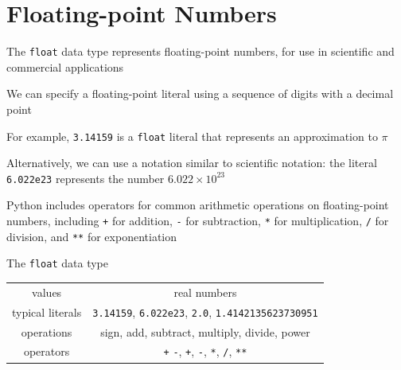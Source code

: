 \documentclass[8pt,a4paper,compress]{beamer}
\begin{document}
\section{Floating-point Numbers}
\begin{frame}[fragile]
\pause

The \lstinline{float} data type represents floating-point numbers, for use in scientific and commercial applications

\pause\bigskip

We can specify a floating-point literal using a sequence of digits with a decimal point

\pause\bigskip

For example, \lstinline{3.14159} is a \lstinline{float} literal that represents an approximation to $\pi$

\pause\bigskip

Alternatively, we can use a notation similar to scientific notation: the literal \lstinline{6.022e23} represents the number $6.022 \times 10^{23}$

\pause\bigskip

Python includes operators for common arithmetic operations on floating-point numbers, including \lstinline{+} for addition, \lstinline{-} for subtraction, \lstinline{*} for multiplication, \lstinline{/} for division, and \lstinline{**} for exponentiation

\pause\bigskip

The \lstinline{float} data type
\begin{center}
\begin{tabular}{c|c}
values & real numbers \\
typical literals & \lstinline$3.14159$, \lstinline$6.022e23$, \lstinline$2.0$, \lstinline$1.4142135623730951$ \\ 
operations & sign, add, subtract, multiply, divide, power \\
operators & \lstinline$+$ \lstinline$-$, \lstinline$+$, \lstinline$-$, \lstinline$*$, \lstinline$/$, \lstinline$**$
\end{tabular} 
\end{center}
\end{frame}
\end{document}
